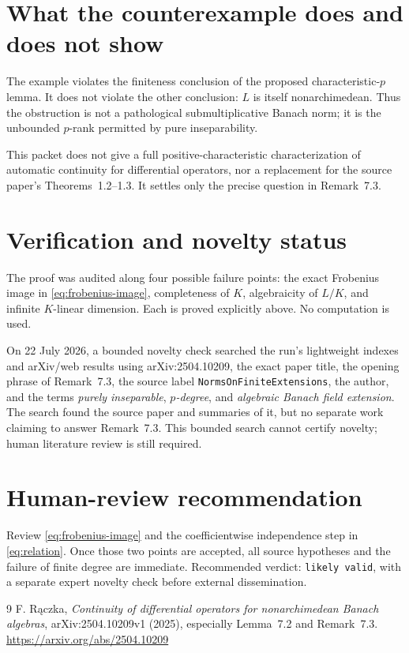 \documentclass[11pt]{article}
\begin{document}
\section{What the counterexample does and does not show}

The example violates the finiteness conclusion of the proposed
characteristic-$p$ lemma.  It does not violate the other conclusion: $L$ is
itself nonarchimedean.  Thus the obstruction is not a pathological
submultiplicative Banach norm; it is the unbounded $p$-rank permitted by pure
inseparability.

This packet does not give a full positive-characteristic characterization of
automatic continuity for differential operators, nor a replacement for the
source paper's Theorems~1.2--1.3.  It settles only the precise question in
Remark~7.3.

\section{Verification and novelty status}

The proof was audited along four possible failure points: the exact Frobenius
image in \eqref{eq:frobenius-image}, completeness of $K$, algebraicity of
$L/K$, and infinite $K$-linear dimension.  Each is proved explicitly above.
No computation is used.

On 22 July 2026, a bounded novelty check searched the run's lightweight
indexes and arXiv/web results using arXiv:2504.10209, the exact paper title,
the opening phrase of Remark~7.3, the source label
\texttt{NormsOnFiniteExtensions}, the author, and the terms \emph{purely
inseparable}, \emph{$p$-degree}, and \emph{algebraic Banach field extension}.
The search found the source paper and summaries of it, but no separate work
claiming to answer Remark~7.3.  This bounded search cannot certify novelty;
human literature review is still required.

\enlargethispage{6\baselineskip}
\section{Human-review recommendation}

Review \eqref{eq:frobenius-image} and the coefficientwise independence step
in \eqref{eq:relation}.  Once those two points are accepted, all source
hypotheses and the failure of finite degree are immediate.  Recommended
verdict: \texttt{likely valid}, with a separate expert novelty check before
external dissemination.

\begin{thebibliography}{9}
F. R\k{a}czka,
\emph{Continuity of differential operators for nonarchimedean Banach
algebras}, arXiv:2504.10209v1 (2025), especially Lemma~7.2 and Remark~7.3.
\url{https://arxiv.org/abs/2504.10209}
\end{thebibliography}
\end{document}
